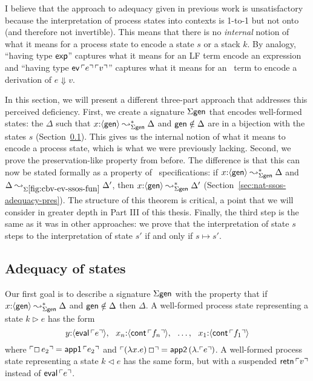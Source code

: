 I believe that the approach to adequacy given in previous work is
unsatisfactory because the interpretation of process states into
contexts is 1-to-1 but not onto (and therefore not invertible).  This
means that there is no {\it internal} notion of what it means for a
process state to encode a state $s$ or a stack $k$. By analogy,
``having type ${\sf exp}$'' captures what it means for an LF term
encode an expression and ``having type ${\sf
  ev}\,{\ulcorner{e}\urcorner}\,{\ulcorner{v}\urcorner}$'' captures what it means for an
\sls~term to encode a derivation of $e \Downarrow v$.

In this section, we will present a different three-part approach that
addresses this perceived deficiency. First, we create a signature
$\Sigma\sf gen$ that encodes well-formed states: the $\Delta$ such
that $x{:}\langle {\sf gen} \rangle \leadsto^*_{\Sigma\sf gen} \Delta$ and ${\sf
  gen} \notin \Delta$ are in a bijection with the states $s$
(Section~\ref{sec:nat-ssos-adequacy-gen}). This gives us the internal
notion of what it means to encode a process state, which is what we
were previously lacking. Second, we prove the preservation-like
property from before. The difference is that this can now be stated
formally as a property of \sls~specifications: if $x{:}\langle {\sf gen} \rangle
\leadsto^*_{\Sigma\sf gen} \Delta$ and $\Delta
\leadsto_{\Sigma\ref{fig:cbv-ev-ssos-fun}} \Delta'$, then $x{:}
\langle {\sf gen} \rangle \leadsto^*_{\Sigma\sf gen} \Delta'$
(Section~\ref{sec:nat-ssos-adequacy-pres}). The structure of this
theorem is critical, a point that we will consider in greater depth in
Part III of this thesis. Finally, the third step is the same as it was
in other approaches: we prove that the interpretation of state $s$
steps to the interpretation of state $s'$ if and only if $s \mapsto s'$.

\subsection{Adequacy of states}
\label{sec:nat-ssos-adequacy-gen}

Our first goal is to describe a signature $\Sigma\sf gen$ with the
property that if $x{:}\langle {\sf gen} \rangle \leadsto^*_{\Sigma\sf gen}
\Delta$ and ${\sf gen} \notin \Delta$ then $\Delta$. A well-formed
process state representing a state $k \rhd e$ has the form
\[
y{:}\langle {{\sf eval}\,{\ulcorner{e}\urcorner}} \rangle, ~~
x_n{:}\langle {{\sf cont}\,{\ulcorner{f_n}\urcorner}} \rangle, ~~
\ldots, ~~
x_1{:}\langle {{\sf cont}\,{\ulcorner{f_1}\urcorner}} \rangle
\]
where ${\ulcorner{\Box\,e_2}\urcorner} = {\sf app1}\,{\ulcorner{e_2}\urcorner}$ and
${\ulcorner{(\lambda x.e)\,\Box}\urcorner} = {\sf app2}\,(\lambda.{\ulcorner{e}\urcorner})$. 
A well-formed process state representing a state $k \lhd e$ has 
the same form, but with a suspended ${\sf retn}\,{\ulcorner{v}\urcorner}$ instead
of ${\sf eval}\,{\ulcorner{e}\urcorner}$. 

